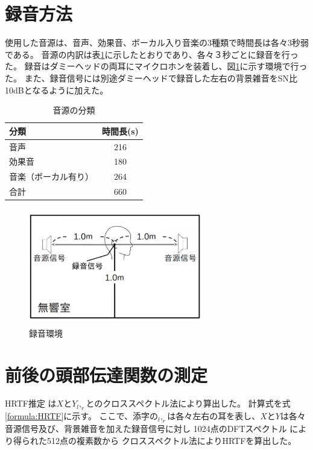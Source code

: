 \documentclass[autodetect-engine,12pt,titlepagedvi=dvipdfmx,ja=standard]{bxjsreport}
\begin{document}
\section{録音方法}
使用した音源は、音声、効果音、ボーカル入り音楽の3種類で時間長は各々3秒弱である。
音源の内訳は表\ref{tb:fugafuga1}に示したとおりであり、各々３秒ごとに録音を行った。
録音はダミーヘッドの両耳にマイクロホンを装着し、図\ref{fig:0}に示す環境で行った。
また、録音信号には別途ダミーヘッドで録音した左右の背景雑音をSN比10dBとなるように加えた。

\begin{table}[htbp]
  \centering
  \begin{tabular}{l|c}
    分類 & 時間長(s)  \\ \hline\hline
    音声 & 216  \\
    効果音 & 180  \\
    音楽（ボーカル有り） & 264  \\ \hline
    合計 & 660  \\
  \end{tabular}
  \caption{音源の分類}
  \label{tb:fugafuga1}
\end{table}

\begin{figure}[htbp]
\begin{center}
\includegraphics[clip, width=3.0in, height = 2.0in]{picture/environment.eps}
\end{center}
\caption{録音環境}\label{fig:0}
\end{figure}

\clearpage

\section{前後の頭部伝達関数の測定}
HRTF推定
は$X$と$Y_l,_r$とのクロススペクトル法により算出した。
計算式を式\ref{formula:HRTF}に示す。
ここで、添字の$_l,_r$は各々左右の耳を表し、$X$と$Y$は各々
音源信号及び、背景雑音を加えた録音信号に対し
1024点のDFTスペクトル
により得られた512点の複素数から
クロススペクトル法によりHRTFを算出した。
\end{document}
